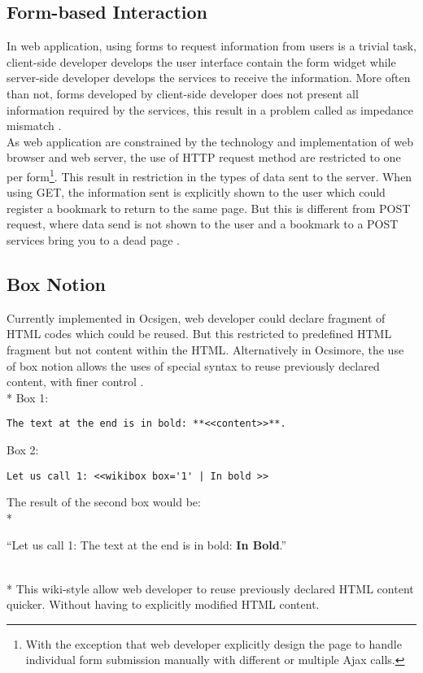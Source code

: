 \documentclass[12pt,fullpage]{article}
\begin{document}
\subsection{Form-based Interaction}
In web application, using forms to request information from users is a trivial
task, client-side developer develops the user interface contain the form widget
while server-side developer develops the services to receive the information.
More often than not, forms developed by client-side developer does not present
all information required by the services, this result in a problem called as
impedance mismatch \parencite{links06}.
\\
As web application are constrained by the technology and implementation of web
browser and web server, the use of HTTP request method are restricted to one per
form\footnote{With the exception that web developer explicitly design the
page to handle individual form submission manually with different or multiple
Ajax calls.}. This result in restriction in the types of data sent to the server.
When using GET, the information sent is explicitly shown to the user which could
register a bookmark to return to the same page. But this is different from POST
request, where data send is not shown to the user and a bookmark to a POST
services bring you to a dead page \parencite{balat06}.

\subsection{Box Notion}
Currently implemented in Ocsigen, web developer could declare fragment of HTML
codes which could be reused. But this restricted to predefined HTML fragment
but not content within the HTML. Alternatively in Ocsimore, the use of box
notion allows the uses of special syntax to reuse previously declared content,
with finer control \parencite{balat09}.
\\* Box 1:
\begin{verbatim}
The text at the end is in bold: **<<content>>**.
\end{verbatim}
Box 2:
\begin{verbatim}
Let us call 1: <<wikibox box='1' | In bold >>
\end{verbatim}
The result of the second box would be:
\\*
\centerline{``Let us call 1: The text at the end is in bold: {\bf In Bold}.''}
\\*
This wiki-style allow web developer to reuse previously declared HTML
content quicker. Without having to explicitly modified HTML content.
\end{document}
